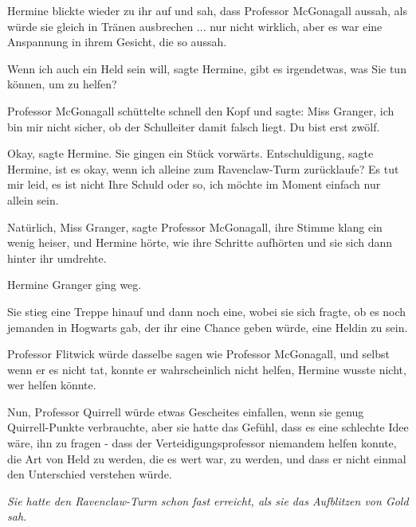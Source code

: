 Hermine blickte wieder zu ihr auf und sah, dass Professor McGonagall aussah, als
würde sie gleich in Tränen ausbrechen ... nur nicht wirklich, aber es war eine
Anspannung in ihrem Gesicht, die so aussah.

\glqq{}Wenn ich auch ein Held sein will\grqq{}, sagte Hermine, \glqq{}gibt es
irgendetwas, was Sie tun können, um zu helfen?\grqq{}

Professor McGonagall schüttelte schnell den Kopf und sagte: \glqq{}Miss Granger,
ich bin mir nicht sicher, ob der Schulleiter damit falsch liegt. Du bist erst
zwölf.\grqq{}

\glqq{}Okay\grqq{}, sagte Hermine. Sie gingen ein Stück vorwärts. \glqq
Entschuldigung\grqq{}, sagte Hermine, \glqq{}ist es okay, wenn ich alleine zum
Ravenclaw-Turm zurücklaufe? Es tut mir leid, es ist nicht Ihre Schuld oder so,
ich möchte im Moment einfach nur allein sein.\grqq{}

\glqq{}Natürlich, Miss Granger\grqq{}, sagte Professor McGonagall, ihre Stimme
klang ein wenig heiser, und Hermine hörte, wie ihre Schritte aufhörten und sie
sich dann hinter ihr umdrehte.

Hermine Granger ging weg.

Sie stieg eine Treppe hinauf und dann noch eine, wobei sie sich fragte, ob es
noch jemanden in Hogwarts gab, der ihr eine Chance geben würde, eine Heldin zu
sein.

Professor Flitwick würde dasselbe sagen wie Professor McGonagall, und selbst
wenn er es nicht tat, konnte er wahrscheinlich nicht helfen, Hermine wusste
nicht, wer helfen könnte.

Nun, Professor Quirrell würde etwas Gescheites einfallen, wenn sie genug
Quirrell-Punkte verbrauchte, aber sie hatte das Gefühl, dass es eine schlechte
Idee wäre, ihn zu fragen - dass der Verteidigungsprofessor niemandem helfen
konnte, die Art von Held zu werden, die es wert war, zu werden, und dass er
nicht einmal den Unterschied verstehen würde.

\emph{Sie hatte den Ravenclaw-Turm
schon fast erreicht, als sie das Aufblitzen von Gold sah.}

